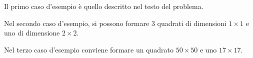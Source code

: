
\Explanation

Il primo caso d'esempio è quello descritto nel testo del problema.

Nel secondo caso d'esempio, si possono formare $3$ quadrati di dimensioni $1\times1$ e uno di dimensione $2\times2$.

Nel terzo caso d'esempio conviene formare un quadrato $50\times50$ e uno $17\times17$.